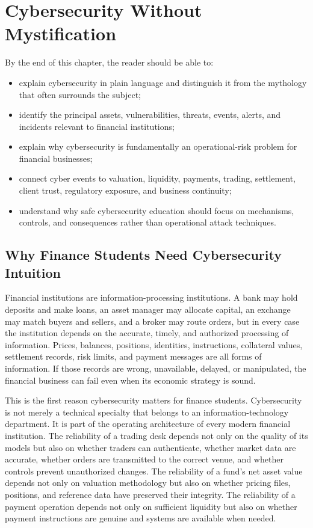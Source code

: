\chapter{Cybersecurity Without Mystification}

\begin{learningobjectives}
By the end of this chapter, the reader should be able to:
\begin{itemize}
    \item explain cybersecurity in plain language and distinguish it from the mythology that often surrounds the subject;
    \item identify the principal assets, vulnerabilities, threats, events, alerts, and incidents relevant to financial institutions;
    \item explain why cybersecurity is fundamentally an operational-risk problem for financial businesses;
    \item connect cyber events to valuation, liquidity, payments, trading, settlement, client trust, regulatory exposure, and business continuity;
    \item understand why safe cybersecurity education should focus on mechanisms, controls, and consequences rather than operational attack techniques.
\end{itemize}
\end{learningobjectives}

\section{Why Finance Students Need Cybersecurity Intuition}

Financial institutions are information-processing institutions. A bank may hold deposits and make loans, an asset manager may allocate capital, an exchange may match buyers and sellers, and a broker may route orders, but in every case the institution depends on the accurate, timely, and authorized processing of information. Prices, balances, positions, identities, instructions, collateral values, settlement records, risk limits, and payment messages are all forms of information. If those records are wrong, unavailable, delayed, or manipulated, the financial business can fail even when its economic strategy is sound.

This is the first reason cybersecurity matters for finance students. Cybersecurity is not merely a technical specialty that belongs to an information-technology department. It is part of the operating architecture of every modern financial institution. The reliability of a trading desk depends not only on the quality of its models but also on whether traders can authenticate, whether market data are accurate, whether orders are transmitted to the correct venue, and whether controls prevent unauthorized changes. The reliability of a fund's net asset value depends not only on valuation methodology but also on whether pricing files, positions, and reference data have preserved their integrity. The reliability of a payment operation depends not only on sufficient liquidity but also on whether payment instructions are genuine and systems are available when needed.

